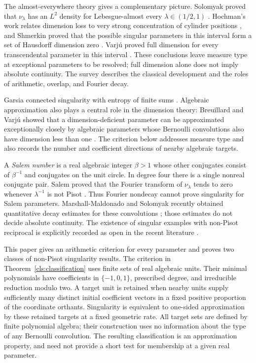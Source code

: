 \documentclass[11pt]{article}
\theoremstyle{definition}
\theoremstyle{remark}
\numberwithin{equation}{section}
\begin{document}
The almost-everywhere theory gives a complementary picture. Solomyak proved that $\nu_\lambda$ has an $L^2$ density for Lebesgue-almost every $\lambda\in(1/2,1)$ \cite{Solomyak1995}. Hochman's work relates dimension loss to very strong concentration of cylinder positions \cite{Hochman2014}, and Shmerkin proved that the possible singular parameters in this interval form a set of Hausdorff dimension zero \cite{Shmerkin2014}. Varj\'u proved full dimension for every transcendental parameter in this interval \cite{VarjuTranscendental2019}. These conclusions leave measure type at exceptional parameters to be resolved; full dimension alone does not imply absolute continuity. The survey \cite{PeresSchlagSolomyak2000} describes the classical development and the roles of arithmetic, overlap, and Fourier decay.

Garsia connected singularity with entropy of finite sums \cite{Garsia1963}. Algebraic approximation also plays a central role in the dimension theory: Breuillard and Varj\'u showed that a dimension-deficient parameter can be approximated exceptionally closely by algebraic parameters whose Bernoulli convolutions also have dimension less than one \cite[Theorem~1]{BreuillardVarju2019}. The criterion below addresses measure type and also records the number and coefficient directions of nearby algebraic targets.

A \emph{Salem number} is a real algebraic integer $\beta>1$ whose other conjugates consist of $\beta^{-1}$ and conjugates on the unit circle. In degree four there is a single nonreal conjugate pair. Salem proved that the Fourier transform of $\nu_\lambda$ tends to zero whenever $\lambda^{-1}$ is not Pisot \cite{Salem1943}. Thus Fourier nondecay cannot prove singularity for Salem parameters. Marshall-Maldonado and Solomyak recently obtained quantitative decay estimates for these convolutions \cite[Appendix~B]{MarshallMaldonadoSolomyak2026}; those estimates do not decide absolute continuity. The existence of singular examples with non-Pisot reciprocal is explicitly recorded as open in the recent literature \cite{BakerEtAl2026,KernSterk2026}.

This paper gives an arithmetic criterion for every parameter and proves two classes of non-Pisot singularity results. The criterion in Theorem~\ref{cls:classification} uses finite sets of real algebraic units. Their minimal polynomials have coefficients in $\{-1,0,1\}$, prescribed degree, and irreducible reduction modulo two. A target unit is retained when nearby units supply sufficiently many distinct initial coefficient vectors in a fixed positive proportion of the coordinate orthants. Singularity is equivalent to one-sided approximation by these retained targets at a fixed geometric rate. All target sets are defined by finite polynomial algebra; their construction uses no information about the type of any Bernoulli convolution. The resulting classification is an approximation property, and need not provide a short test for membership at a given real parameter.
\end{document}
